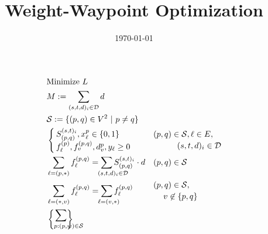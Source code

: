 \documentclass[a4paper,USenglish]{article}
\title{Weight-Waypoint Optimization}
\date{\today}
\begin{document}
\maketitle

\begin{align}
& \text{Minimize} ~L \nonumber	&&\\
&M := \sum_{(s,t,d)_i \in \mathcal{D}} d &&
\\
&\mathcal{S} := \{(p,q) \in V^2 ~|~  p \neq q \}	&&
\\
&\begin{cases}
	S^{(s,t)_i}_{(p,q)}, x^{p}_{\ell} \in \{0,1\} \\	%
	f^{(p)}_{\ell}, f^{(p,q)}_{v}, d^{p}_v, y_{\ell}  \geq 0
\end{cases}
&&
\begin{multlined}
	  (p,q) \in \mathcal{S}, \ell \in E, \\
	   (s,t,d)_i \in \mathcal{D}
\end{multlined}	 \label{LP:vardef}    
\\
&\sum_{\ell = (p,*)} f^{(p,q)}_{\ell}  =
\sum_{\hspace{-5ex}\mathrlap{ (s,t,d)_i \in \mathcal{D}}} 
	S^{(s,t)_i}_{(p,q)} \cdot d 
&&	 (p,q) \in \mathcal{S}	\label{LP:flowWP}
\\
&\sum_{\ell = (*,v)} f^{(p,q)}_{\ell} =
	\sum_{\hspace{-5ex}\mathrlap{\ell= (v,*)} }f^{(p,q)}_{\ell} 
&&
\begin{multlined}
	(p,q) \in \mathcal{S}, \\
	 v \not\in \{p,q\}
\end{multlined} 	\label{LP:flowcons}
\\
&
\begin{dcases}
 \begin{drcases}
	\sum_{\hspace{-4ex}\mathrlap{ p:(p,w) \in \mathcal{S}}}

\end{drcases}
\end{dcases}
\end{align}
\end{document}
